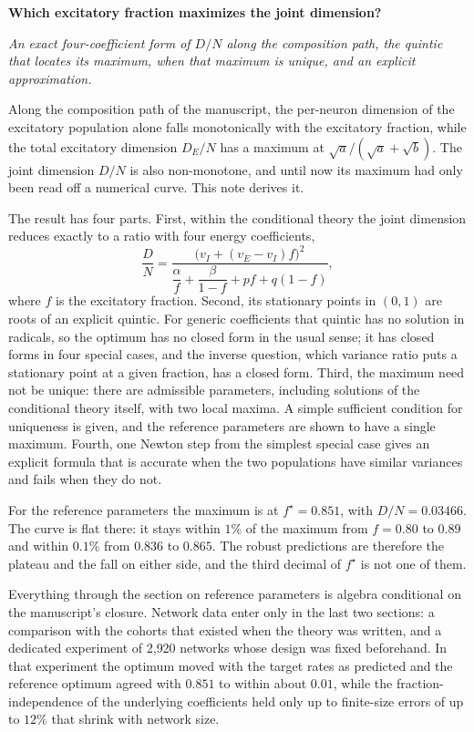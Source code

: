 \documentclass[11pt]{article}
\begin{document}
{\Large\bfseries Which excitatory fraction maximizes the joint dimension?}

\emph{An exact four-coefficient form of $D/N$ along the composition path, the quintic that locates its maximum, when that maximum is unique, and an explicit approximation.}

Along the composition path of the manuscript, the per-neuron dimension of the excitatory population alone falls monotonically with the excitatory fraction, while the total excitatory dimension $D_E/N$ has a maximum at $\sqrt a/(\sqrt a+\sqrt b)$. The joint dimension $D/N$ is also non-monotone, and until now its maximum had only been read off a numerical curve. This note derives it.

The result has four parts. First, within the conditional theory the joint dimension reduces exactly to a ratio with four energy coefficients,
\[
 \frac DN=\frac{\bigl(v_I+(v_E-v_I)f\bigr)^2}{\dfrac{\alpha}{f}+\dfrac{\beta}{1-f}+pf+q(1-f)},
\]
where $f$ is the excitatory fraction. Second, its stationary points in $(0,1)$ are roots of an explicit quintic. For generic coefficients that quintic has no solution in radicals, so the optimum has no closed form in the usual sense; it has closed forms in four special cases, and the inverse question, which variance ratio puts a stationary point at a given fraction, has a closed form. Third, the maximum need not be unique: there are admissible parameters, including solutions of the conditional theory itself, with two local maxima. A simple sufficient condition for uniqueness is given, and the reference parameters are shown to have a single maximum. Fourth, one Newton step from the simplest special case gives an explicit formula that is accurate when the two populations have similar variances and fails when they do not.

For the reference parameters the maximum is at $f^\star=0.851$, with $D/N=0.03466$. The curve is flat there: it stays within $1\%$ of the maximum from $f=0.80$ to $0.89$ and within $0.1\%$ from $0.836$ to $0.865$. The robust predictions are therefore the plateau and the fall on either side, and the third decimal of $f^\star$ is not one of them.

Everything through the section on reference parameters is algebra conditional on the manuscript's closure. Network data enter only in the last two sections: a comparison with the cohorts that existed when the theory was written, and a dedicated experiment of 2{,}920 networks whose design was fixed beforehand. In that experiment the optimum moved with the target rates as predicted and the reference optimum agreed with $0.851$ to within about $0.01$, while the fraction-independence of the underlying coefficients held only up to finite-size errors of up to $12\%$ that shrink with network size.
\end{document}
